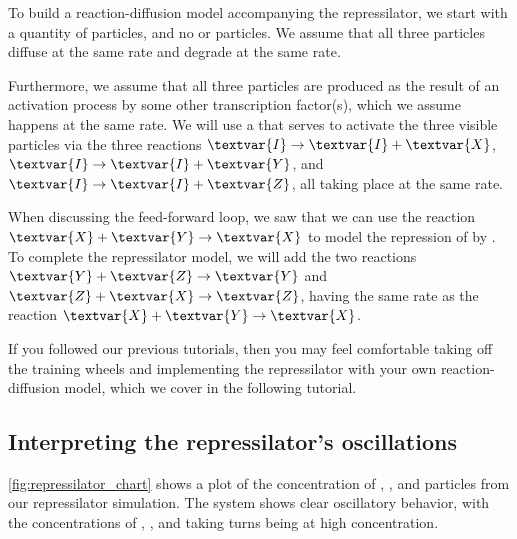 \begin{qbox}\end{qbox}

To build a reaction-diffusion model accompanying the repressilator, we start with a quantity of  particles, and no  or  particles. We assume that all three particles diffuse at the same rate and degrade at the same rate.

Furthermore, we assume that all three particles are produced as the result of an activation process by some other transcription factor(s), which we assume happens at the same rate. We will use a   that serves to activate the three visible particles via the three reactions $\textvar{I} \rightarrow \textvar{I} + \textvar{X}$, $\textvar{I} \rightarrow \textvar{I} + \textvar{Y}$, and $\textvar{I} \rightarrow \textvar{I} + \textvar{Z}$, all taking place at the same rate.

When discussing the feed-forward loop, we saw that we can use the reaction $\textvar{X} + \textvar{Y} \rightarrow \textvar{X}$ to model the repression of  by . To complete the repressilator model, we will add the two reactions $\textvar{Y} + \textvar{Z} \rightarrow \textvar{Y}$ and $\textvar{Z} + \textvar{X} \rightarrow \textvar{Z}$, having the same rate as the reaction $\textvar{X} + \textvar{Y} \rightarrow \textvar{X}$.

If you followed our previous tutorials, then you may feel comfortable taking off the training wheels and implementing the repressilator with your own reaction-diffusion model, which we cover in the following tutorial.


\FloatBarrier
{}
\subsection{Interpreting the repressilator's oscillations}

\autoref{fig:repressilator_chart} shows a plot of the concentration of , , and  particles from our repressilator simulation. The system shows clear oscillatory behavior, with the concentrations of , , and  taking turns being at high concentration.\\

